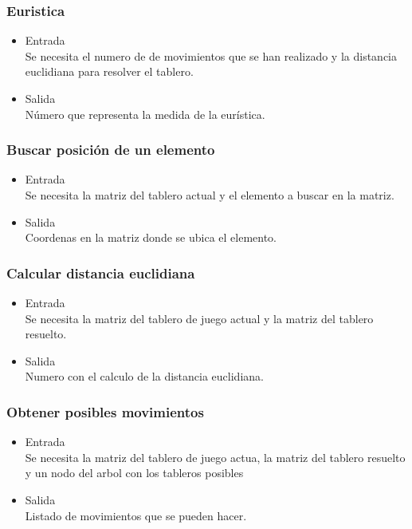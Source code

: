 \documentclass{article}
\begin{document}
\subsubsection{Euristica}
\begin{itemize}
    \item Entrada
    \\Se necesita el numero de de movimientos que se han realizado y la distancia euclidiana para resolver el tablero.
    \item Salida
    \\Número que representa la medida de la eurística.
\end{itemize}

\subsubsection{Buscar posición de un elemento}
\begin{itemize}
    \item Entrada
    \\Se necesita la matriz del tablero actual y el elemento a buscar en la matriz.
    \item Salida
    \\Coordenas en la matriz donde se ubica el elemento.
\end{itemize}

\subsubsection{Calcular distancia euclidiana}
\begin{itemize}
    \item Entrada
    \\Se necesita la matriz del tablero de juego actual y la matriz del tablero resuelto.
    \item Salida
    \\Numero con el calculo de la distancia euclidiana.
\end{itemize}

\subsubsection{Obtener posibles movimientos}
\begin{itemize}
    \item Entrada
    \\Se necesita la matriz del tablero de juego actua, la matriz del tablero resuelto y un nodo del arbol con los tableros posibles
    \item Salida
    \\Listado de movimientos que se pueden hacer.
\end{itemize}
\end{document}
